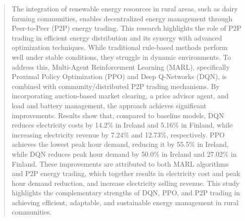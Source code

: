 \documentclass[preprint,12pt]{elsarticle}
\begin{document}
\begin{frontmatter}
\begin{abstract}




The integration of renewable energy resources in rural areas, such as dairy farming communities, enables decentralized energy management through Peer-to-Peer (P2P) energy trading. This research highlights the role of P2P trading in efficient energy distribution and its synergy with advanced optimization techniques. While traditional rule-based methods perform well under stable conditions, they struggle in dynamic environments. To address this, Multi-Agent Reinforcement Learning (MARL), specifically Proximal Policy Optimization (PPO) and Deep Q-Networks (DQN), is combined with community/distributed P2P trading mechanisms. By incorporating auction-based market clearing, a price advisor agent, and load and battery management, the approach achieves significant improvements. Results show that, compared to baseline models, DQN reduces electricity costs by 14.2\% in Ireland and 5.16\% in Finland, while increasing electricity revenue by 7.24\% and 12.73\%, respectively. PPO achieves the lowest peak hour demand, reducing it by 55.5\% in Ireland, while DQN reduces peak hour demand by 50.0\% in Ireland and 27.02\% in Finland. These improvements are attributed to both MARL algorithms and P2P energy trading, which together results in electricity cost and peak hour demand reduction, and increase electricity selling revenue. This study highlights the complementary strengths of DQN, PPO, and P2P trading in achieving efficient, adaptable, and sustainable energy management in rural communities.



\end{abstract}
\end{frontmatter}
\end{document}
